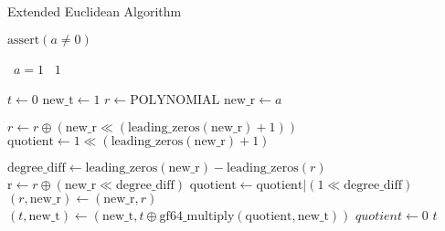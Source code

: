 \begin{algorithm}
\caption{Extended Euclidean Algorithm}
\begin{algorithmic}

\State $\text{assert}(a \neq 0)$

\State \algorithmicif\ $a = 1$ \algorithmicthen\ \Return $1$ \algorithmicend \algorithmicif

\State $t \gets 0$
\State $\text{new\_t} \gets 1$
\State $r \gets \text{POLYNOMIAL}$
\State $\text{new\_r} \gets a$

\State $r \gets r \oplus (\text{new\_r} \ll (\text{leading\_zeros}(\text{new\_r}) + 1))$
\State $\text{quotient} \gets 1 \ll (\text{leading\_zeros}(\text{new\_r}) + 1)$

        \State $\text{degree\_diff} \gets \text{leading\_zeros}(\text{new\_r}) - \text{leading\_zeros}(r)$
        \State $\text{r} \gets r \oplus (\text{new\_r} \ll \text{degree\_diff})$
        \State $\text{quotient} \gets \text{quotient} | (1 \ll \text{degree\_diff})$
    \EndWhile
    \State $(r, \text{new\_r}) \gets (\text{new\_r}, r)$
    \State $(t, \text{new\_t}) \gets (\text{new\_t}, t \oplus \text{gf64\_multiply}(\text{quotient}, \text{new\_t}))$
    \State $quotient \gets 0$
\EndWhile
\State \Return $t$
\EndFunction
\end{algorithmic}
\end{algorithm}
